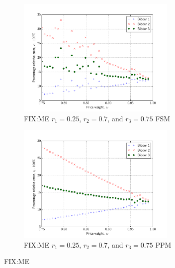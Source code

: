 \begin{figure}[p!]
  \setcounter{subfigure}{0}
  \begin{subfigure}[b]{0.5\textwidth}
    \includegraphics[width=3in]{Approximation/Figures/compare_3_bidders_025_070_075}
    \caption{FIX:ME $r_1=0.25$, $r_2=0.7$, and $r_3=0.75$ FSM}
    \label{fig:compare_3_bidders_025_070_075_fsm_approximation}
  \end{subfigure}
  \begin{subfigure}[b]{0.5\textwidth}
    \includegraphics[width=3in]{Approximation/Figures/compare_3_bidders_025_070_075_ppm}
    \caption{FIX:ME $r_1=0.25$, $r_2=0.7$, and $r_3=0.75$ PPM}
    \label{fig:compare_3_bidders_025_070_075_ppm_approximation}
  \end{subfigure}
  \caption{FIX:ME}
  \label{fig:compare_3_bidders_025_070_075_approximation}
\end{figure}

